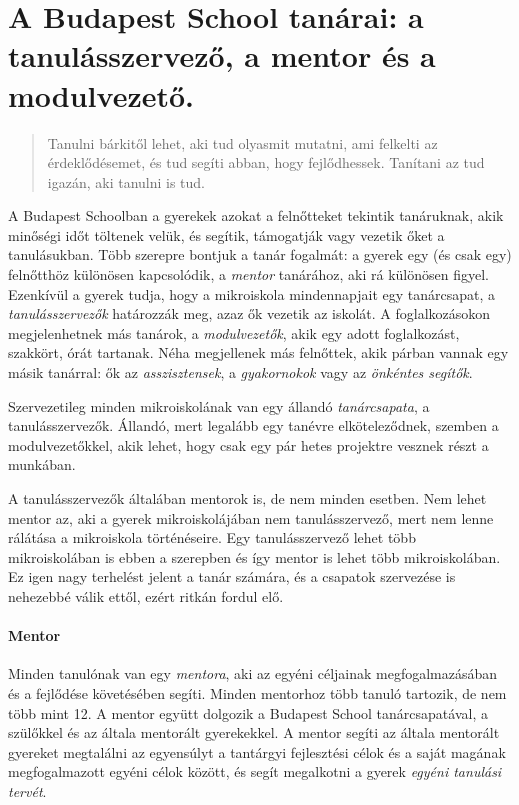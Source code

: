  \section{A Budapest School tanárai: a tanulásszervező, a mentor és a modulvezető.}
  \label{sec:tanarok}
  \begin{quote}

    Tanulni bárkitől lehet, aki tud olyasmit mutatni, ami felkelti az
    érdeklődésemet, és tud segíti abban, hogy fejlődhessek. Tanítani az tud igazán, aki tanulni is tud.
\end{quote}
A Budapest Schoolban a gyerekek azokat a felnőtteket tekintik tanáruknak, akik minőségi időt töltenek velük, és segítik, támogatják vagy vezetik őket a tanulásukban. Több szerepre bontjuk a tanár fogalmát: a gyerek egy (és csak egy) felnőtthöz különösen kapcsolódik, a \emph{mentor} tanárához, aki rá különösen figyel. Ezenkívül a gyerek tudja, hogy a mikroiskola mindennapjait egy tanárcsapat, a \emph{tanulásszervezők} határozzák meg, azaz ők vezetik az iskolát.  A foglalkozásokon megjelenhetnek más tanárok, a \emph{modulvezetők}, akik egy adott foglalkozást, szakkört, órát tartanak. Néha megjellenek más felnőttek, akik párban vannak egy másik tanárral: ők az \emph{asszisztensek}, a \emph{gyakornokok} vagy az \emph{önkéntes segítők}.

Szervezetileg minden mikroiskolának van egy állandó \emph{tanárcsapata}, a tanulásszervezők. Állandó, mert legalább egy tanévre elköteleződnek, szemben a modulvezetőkkel, akik lehet, hogy csak egy pár hetes projektre vesznek részt a munkában.

A tanulásszervezők általában mentorok is, de nem minden esetben. Nem lehet mentor az, aki a gyerek mikroiskolájában nem tanulásszervező, mert nem lenne rálátása a mikroiskola történéseire. Egy tanulásszervező lehet több mikroiskolában is ebben a szerepben és így mentor is lehet több mikroiskolában. Ez igen nagy terhelést jelent a tanár számára, és a csapatok szervezése is nehezebbé válik ettől, ezért ritkán fordul elő.

\paragraph{Mentor}
  Minden tanulónak van egy \emph{mentora}, aki az egyéni céljainak megfogalmazásában és
  a fejlődése követésében segíti. Minden mentorhoz több tanuló tartozik, de nem
  több mint 12. A mentor együtt dolgozik a Budapest School tanárcsapatával, a
  szülőkkel és az általa mentorált gyerekekkel. A mentor segíti az általa
  mentorált gyereket megtalálni az egyensúlyt a tantárgyi fejlesztési célok és a
  saját magának megfogalmazott egyéni célok között, és segít megalkotni a gyerek \emph{egyéni
  tanulási tervét}.

